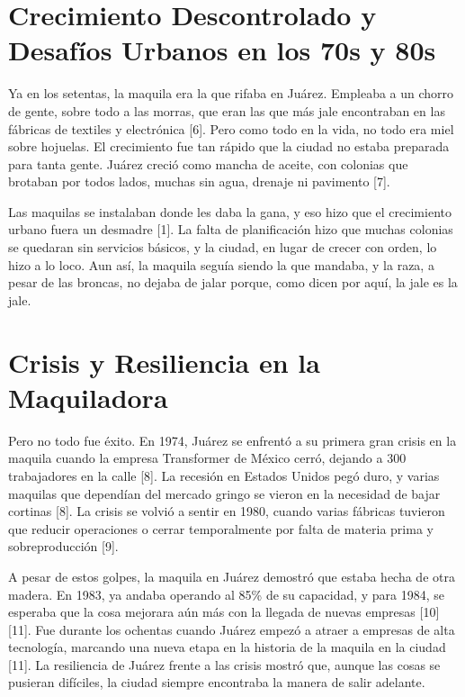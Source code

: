 \section{Crecimiento Descontrolado y Desafíos Urbanos en los 70s y 80s}

Ya en los setentas, la maquila era la que rifaba en Juárez. Empleaba a un chorro de gente, sobre todo a las morras, que eran las que más jale encontraban en las fábricas de textiles y electrónica [6]. Pero como todo en la vida, no todo era miel sobre hojuelas. El crecimiento fue tan rápido que la ciudad no estaba preparada para tanta gente. Juárez creció como mancha de aceite, con colonias que brotaban por todos lados, muchas sin agua, drenaje ni pavimento [7].

Las maquilas se instalaban donde les daba la gana, y eso hizo que el crecimiento urbano fuera un desmadre [1]. La falta de planificación hizo que muchas colonias se quedaran sin servicios básicos, y la ciudad, en lugar de crecer con orden, lo hizo a lo loco. Aun así, la maquila seguía siendo la que mandaba, y la raza, a pesar de las broncas, no dejaba de jalar porque, como dicen por aquí, la jale es la jale.

\section{Crisis y Resiliencia en la Maquiladora}

Pero no todo fue éxito. En 1974, Juárez se enfrentó a su primera gran crisis en la maquila cuando la empresa Transformer de México cerró, dejando a 300 trabajadores en la calle [8]. La recesión en Estados Unidos pegó duro, y varias maquilas que dependían del mercado gringo se vieron en la necesidad de bajar cortinas [8]. La crisis se volvió a sentir en 1980, cuando varias fábricas tuvieron que reducir operaciones o cerrar temporalmente por falta de materia prima y sobreproducción [9].

A pesar de estos golpes, la maquila en Juárez demostró que estaba hecha de otra madera. En 1983, ya andaba operando al 85\% de su capacidad, y para 1984, se esperaba que la cosa mejorara aún más con la llegada de nuevas empresas [10][11]. Fue durante los ochentas cuando Juárez empezó a atraer a empresas de alta tecnología, marcando una nueva etapa en la historia de la maquila en la ciudad [11]. La resiliencia de Juárez frente a las crisis mostró que, aunque las cosas se pusieran difíciles, la ciudad siempre encontraba la manera de salir adelante.


